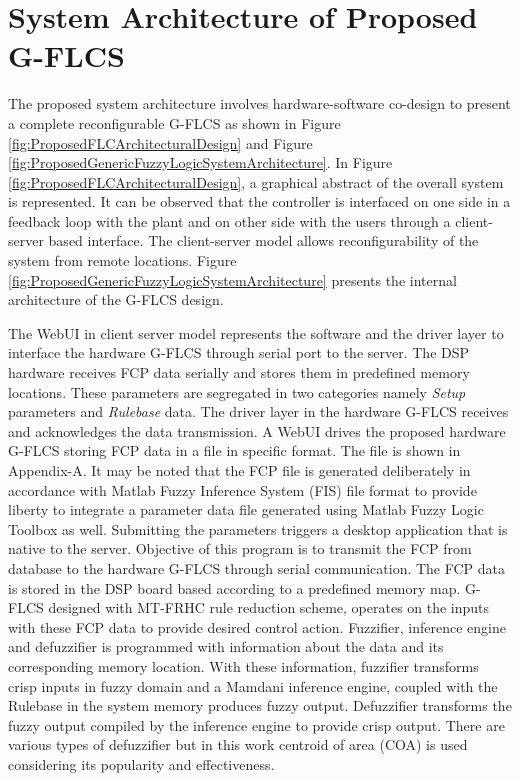\section{System Architecture of Proposed G\hyp{}FLCS}
The proposed system architecture involves hardware\hyp{}software co\hyp{}design to present a complete reconfigurable G\hyp{}FLCS as shown in Figure \ref{fig:ProposedFLCArchitecturalDesign} and Figure \ref{fig:ProposedGenericFuzzyLogicSystemArchitecture}. In Figure \ref{fig:ProposedFLCArchitecturalDesign}, a graphical abstract of the overall system is represented. It can be observed that the controller is interfaced on one side in a feedback loop with the plant and on other side with the users through a client\hyp{}server based interface. The client\hyp{}server model allows reconfigurability of the system from remote locations. Figure \ref{fig:ProposedGenericFuzzyLogicSystemArchitecture} presents the internal architecture of the G\hyp{}FLCS design.  

The WebUI in client server model represents the software and the driver layer to interface the hardware G-FLCS through serial port to the server. The DSP hardware receives FCP data serially and stores them in predefined memory locations. These parameters are segregated in two categories namely \textit{Setup}  parameters and \textit{Rulebase} data. The driver layer in the hardware G\hyp{}FLCS receives and acknowledges the data transmission. 
A WebUI drives the proposed hardware G\hyp{}FLCS storing FCP data in a file in specific format. The file is shown in Appendix-A. It may be noted that the FCP file is generated deliberately in accordance with Matlab Fuzzy Inference System (FIS) file format to provide liberty to integrate a parameter data file generated using Matlab Fuzzy Logic Toolbox as well. Submitting the parameters triggers a desktop application that is native to the server. Objective of this program is to transmit the FCP from database to the hardware G\hyp{}FLCS through serial communication. The FCP data is stored in the DSP board based according to a predefined memory map. G\hyp{}FLCS designed with MT\hyp{}FRHC rule reduction scheme, operates on the inputs with these FCP data to provide desired control action. Fuzzifier, inference engine and defuzzifier is programmed with information about the data and its corresponding memory location. With these information, fuzzifier transforms crisp inputs in fuzzy domain and a Mamdani inference engine, coupled with the Rulebase in the system memory produces fuzzy output. Defuzzifier transforms the fuzzy output compiled by the inference engine to provide crisp output. There are various types of defuzzifier but in this work centroid of area (COA) is used considering its popularity and effectiveness. 

